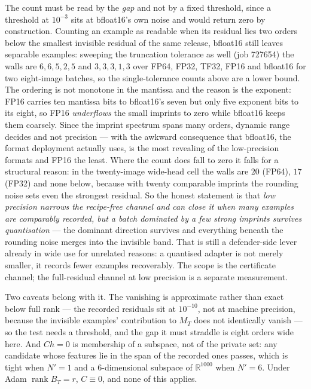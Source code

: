 The count must be read by the \emph{gap} and not by a fixed threshold, since
a threshold at $10^{-3}$ sits at bfloat16's own noise and would return zero by
construction. Counting an example as readable when its residual lies two
orders below the smallest invisible residual of the same release, bfloat16
still leaves separable examples: sweeping the truncation
tolerance as well (job 727654) the walls are $6,6,5,2,5$ and $3,3,3,1,3$ over
FP64, FP32, TF32, FP16 and bfloat16 for two eight-image batches, so the
single-tolerance counts above are a lower bound. The ordering is not
monotone in the mantissa and the reason is the exponent: FP16 carries ten
mantissa bits to bfloat16's seven but only five exponent bits to its eight, so
FP16 \emph{underflows} the small imprints to zero while bfloat16 keeps them
coarsely. Since the imprint spectrum spans many orders, dynamic range decides
and not precision --- with the awkward consequence that bfloat16, the format
deployment actually uses, is the most revealing of the low-precision formats
and FP16 the least. Where the count does fall to zero it falls for a
structural reason: in the twenty-image wide-head cell the walls are $20$
(FP64), $17$ (FP32) and none below, because with twenty comparable imprints
the rounding noise sets even the strongest residual. So the honest statement
is that \emph{low precision narrows the recipe-free channel and can close it
when many examples are comparably recorded, but a batch dominated by a few
strong imprints survives quantisation} --- the dominant direction survives and
everything beneath the rounding noise merges into the invisible band. That is
still a defender-side lever already in wide use for unrelated reasons: a
quantised adapter is not merely smaller, it records fewer examples
recoverably. The scope is the certificate channel; the full-residual channel
at low precision is a separate measurement.

Two caveats belong with it. The vanishing is approximate rather than exact
below full rank — the recorded residuals sit at $10^{-10}$, not at machine
precision, because the invisible examples' contribution to $M_T$ does not
identically vanish — so the test needs a threshold, and the gap it must
straddle is eight orders wide here. And $Ch=0$ is membership of a subspace,
not of the private set: any candidate whose features lie in the span of the
recorded ones passes, which is tight when $N'=1$ and a $6$-dimensional
subspace of $\mathbb R^{1000}$ when $N'=6$. Under Adam
$\operatorname{rank}B_T=r$, $C\equiv0$, and none of this applies.

